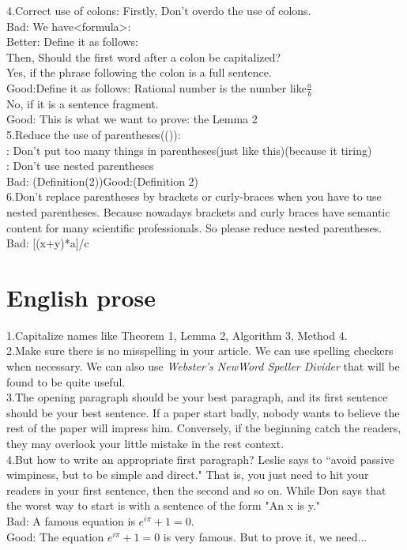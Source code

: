 \documentclass[]{article}
\begin{document}
	\noindent4.Correct use of colons: Firstly, Don't overdo the use of colons.\\
	\indent Bad: We have<formula>:\\
	\indent Better: Define it as follows:\\
	Then, Should the first word after a colon be capitalized?\\
	Yes, if the phrase following the colon is a full sentence.\\
	\indent Good:Define it as follows: Rational number is the number like\(\frac{a}{b}\)\\
	No, if it is a sentence fragment.\\
	\indent Good: This is what we want to prove: the Lemma 2\\
	
	\noindent5.Reduce the use of parentheses(()):\\
	: Don't put too many things in parentheses(just like this)(because it tiring)\\
	: Don't use nested parentheses\\
	Bad: (Definition(2))\quad Good:(Definition 2)\\
	
	\noindent 6.Don't replace parentheses by brackets or curly-braces when you have to use nested parentheses. Because nowadays brackets and curly braces have semantic
	content for many scientific professionals. So please reduce nested parentheses.
	\indent Bad: [(x+y)*a]/c
	
	\section{English prose}	
	1.Capitalize names like Theorem 1, Lemma 2, Algorithm 3, Method 4.\\
	
	\noindent2.Make sure there is no misspelling in your article.  We can use spelling checkers when necessary. We can also use \textit{Webster’s NewWord Speller Divider} that will be found to be quite useful. \\
	
	\noindent3.The opening paragraph should be your best paragraph, and its first sentence should be your best sentence. If a paper start badly, nobody wants to believe the rest of the paper will impress him. Conversely, if the beginning catch the readers, they may overlook your little mistake in the rest context.\\
	
	\noindent4.But how to write an appropriate first paragraph? Leslie says to ``avoid passive wimpiness, but to be simple and direct." That is, you just need to hit your readers in your first sentence, then the second and so on. While Don says that the worst way to start is with a sentence of the form "An x is y." \\
	\indent Bad: A famous equation is \(e^{i\pi}+1=0\).\\
	\indent Good: The equation \(e^{i\pi}+1=0\) is very famous. But to prove it, we need...\\ 
	
\end{document}
